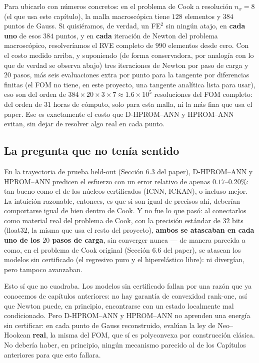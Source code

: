 \documentclass[11pt,a4paper]{article}
\begin{document}
Para ubicarlo con n\'umeros concretos: en el problema de Cook a
resoluci\'on $n_x=8$ (el que usa este cap\'itulo), la malla
macrosc\'opica tiene $128$ elementos y $384$ puntos de Gauss. Si
quisi\'eramos, de verdad, un FE$^2$ sin ning\'un atajo, en
\textbf{cada uno} de esos $384$ puntos, y en \textbf{cada} iteraci\'on
de Newton del problema macrosc\'opico, resolver\'iamos el RVE completo
de $990$ elementos desde cero. Con el costo medido arriba, y suponiendo
(de forma conservadora, por analog\'ia con lo que de verdad se observa
abajo) tres iteraciones de Newton por paso de carga y $20$ pasos, m\'as
seis evaluaciones extra por punto para la tangente por diferencias
finitas (el FOM no tiene, en este proyecto, una tangente anal\'itica
lista para usar), eso son del orden de
$384\times20\times3\times7\approx1.6\times10^5$ resoluciones del FOM
completo: del orden de $31$ horas de c\'omputo, solo para esta malla, ni
la m\'as fina que usa el paper. Ese es exactamente el costo que
D-HPROM--ANN y HPROM--ANN evitan, sin dejar de resolver algo real en
cada punto.

\subsection{La pregunta que no ten\'ia sentido}

En la trayectoria de prueba held-out (Secci\'on 6.3 del paper),
D-HPROM--ANN y HPROM--ANN predicen el esfuerzo con un error relativo de
apenas $0.17$--$0.20\%$: tan bueno como el de los n\'ucleos certificados
(ICNN, ICKAN), o incluso mejor. La intuici\'on razonable, entonces, es
que si son igual de precisos ah\'i, deber\'ian comportarse igual de bien
dentro de Cook. Y no fue lo que pas\'o: al conectarlos como material
real del problema de Cook, con la precisi\'on est\'andar de $32$ bits
(float32, la misma que usa el resto del proyecto), \textbf{ambos se
atascaban en cada uno de los $20$ pasos de carga}, sin converger nunca
--- de manera parecida a como, en el problema de Cook original
(Secci\'on 6.6 del paper), se atascan los modelos sin certificado (el
regresivo puro y el hiperel\'astico libre): ni diverg\'ian, pero tampoco
avanzaban.

Esto s\'i que no cuadraba. Los modelos sin certificado fallan por una
raz\'on que ya conocemos de cap\'itulos anteriores: no hay garant\'ia de
convexidad rank-one, as\'i que Newton puede, en principio, encontrarse
con un estado localmente mal condicionado. Pero D-HPROM--ANN y
HPROM--ANN no aprenden una energ\'ia sin certificar: en cada punto de
Gauss reconstruido, eval\'uan la ley de Neo--Hookean \textbf{real}, la
misma del FOM, que s\'i es polyconvexa por construcci\'on cl\'asica. No
deber\'ia haber, en principio, ning\'un mecanismo parecido al de los
Cap\'itulos anteriores para que esto fallara.
\end{document}
